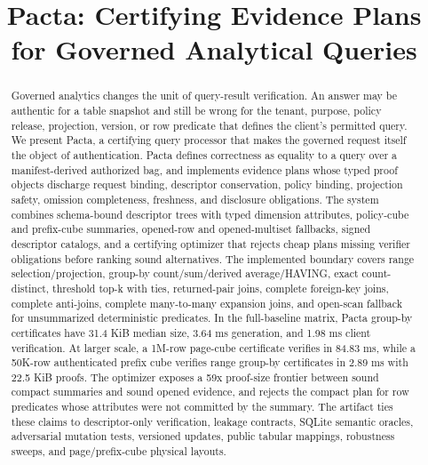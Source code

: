 \documentclass[conference]{IEEEtran}
\newcommand{\sys}{Pacta\xspace}
\begin{document}
\title{Pacta: Certifying Evidence Plans for Governed Analytical Queries}

\author{
}

\maketitle

\begin{abstract}
Governed analytics changes the unit of query-result verification. An answer may be authentic for a table snapshot and still be wrong for the tenant, purpose, policy release, projection, version, or row predicate that defines the client's permitted query. We present \sys, a certifying query processor that makes the governed request itself the object of authentication. \sys defines correctness as equality to a query over a manifest-derived authorized bag, and implements evidence plans whose typed proof objects discharge request binding, descriptor conservation, policy binding, projection safety, omission completeness, freshness, and disclosure obligations. The system combines schema-bound descriptor trees with typed dimension attributes, policy-cube and prefix-cube summaries, opened-row and opened-multiset fallbacks, signed descriptor catalogs, and a certifying optimizer that rejects cheap plans missing verifier obligations before ranking sound alternatives. The implemented boundary covers range selection/projection, group-by count/sum/derived average/HAVING, exact count-distinct, threshold top-k with ties, returned-pair joins, complete foreign-key joins, complete anti-joins, complete many-to-many expansion joins, and open-scan fallback for unsummarized deterministic predicates. In the full-baseline matrix, \sys group-by certificates have 31.4 KiB median size, 3.64 ms generation, and 1.98 ms client verification. At larger scale, a 1M-row page-cube certificate verifies in 84.83 ms, while a 50K-row authenticated prefix cube verifies range group-by certificates in 2.89 ms with 22.5 KiB proofs. The optimizer exposes a 59x proof-size frontier between sound compact summaries and sound opened evidence, and rejects the compact plan for row predicates whose attributes were not committed by the summary. The artifact ties these claims to descriptor-only verification, leakage contracts, SQLite semantic oracles, adversarial mutation tests, versioned updates, public tabular mappings, robustness sweeps, and page/prefix-cube physical layouts.
\end{abstract}
\end{document}
